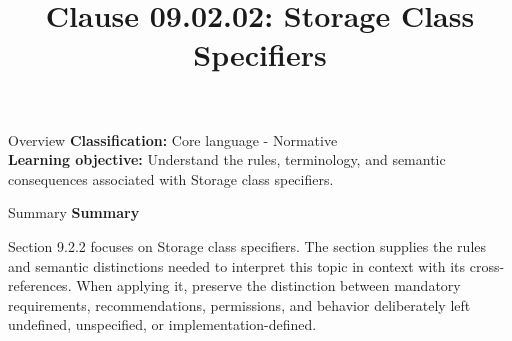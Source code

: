 \documentclass[10pt,letterpaper]{article}
\title{Clause 09.02.02: Storage Class Specifiers}
\author{}
\date{}
\begin{document}
\maketitle
\begin{CornellOverviewBox}{Overview}
\textbf{Classification:} Core language - Normative\\[2pt]
\textbf{Learning objective:} Understand the rules, terminology, and semantic consequences associated with Storage class specifiers.
\end{CornellOverviewBox}\begin{CornellSummaryBox}{Summary}
{\sffamily\bfseries\color{Accent} Summary}\par\vspace{3pt}Section 9.2.2 focuses on Storage class specifiers. The section supplies the rules and semantic distinctions needed to interpret this topic in context with its cross-references. When applying it, preserve the distinction between mandatory requirements, recommendations, permissions, and behavior deliberately left undefined, unspecified, or implementation-defined.
\end{CornellSummaryBox}
\end{document}
